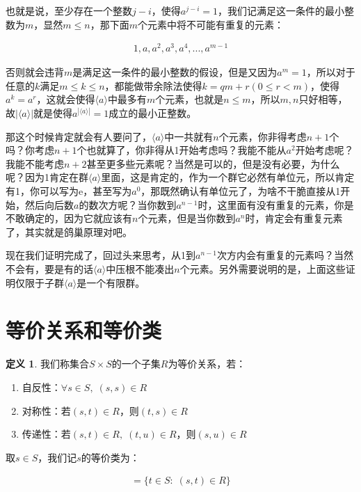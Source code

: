 \documentclass[12pt, a4paper, oneside]{ctexart}
\theoremstyle{definition}
\newtheorem*{definition}{定义}
\begin{document}
也就是说，至少存在一个整数$j-i$，使得$a^{j-i}=1$，我们记满足这一条件的最小整数为$m$，显然$m\leqslant n$，那下面$m$个元素中将不可能有重复的元素：

\begin{align*}
1,a,a^2,a^3,a^4,...,a^{m-1}
\end{align*}

否则就会违背$m$是满足这一条件的最小整数的假设，但是又因为$a^m=1$，所以对于任意的$k$满足$m\leqslant k\leqslant n$，都能做带余除法使得$k=qm+r(0\leqslant r<m)$，使得$a^k=a^r$，这就会使得$\langle a \rangle$中最多有$m$个元素，也就是$n\leqslant m$，所以$m,n$只好相等，故$|\langle a \rangle|$就是使得$a^{|\langle a \rangle|}=1$成立的最小正整数。

那这个时候肯定就会有人要问了，$\langle a \rangle$中一共就有$n$个元素，你非得考虑$n+1$个吗？你考虑$n+1$个也就算了，你非得从1开始考虑吗？我能不能从$a^2$开始考虑呢？我能不能考虑$n+2$甚至更多些元素呢？当然是可以的，但是没有必要，为什么呢？因为1肯定在群$\langle a \rangle$里面，这是肯定的，作为一个群它必然有单位元，所以肯定有1，你可以写为e，甚至写为$a^0$，那既然确认有单位元了，为啥不干脆直接从1开始，然后向后数$a$的数次方呢？当你数到$a^{n-1}$时，这里面有没有重复的元素，你是不敢确定的，因为它就应该有$n$个元素，但是当你数到$a^n$时，肯定会有重复元素了，其实就是鸽巢原理对吧。

现在我们证明完成了，回过头来思考，从1到$a^{n-1}$次方内会有重复的元素吗？当然不会有，要是有的话$\langle a \rangle$中压根不能凑出$n$个元素。另外需要说明的是，上面这些证明仅限于子群$\langle a \rangle$是一个有限群。

\section*{等价关系和等价类}

\begin{definition}
我们称集合$S\times S$的一个子集$R$为等价关系，若：
\begin{enumerate}
\item 自反性：$\forall s\in S,\;(s,s)\in R$
\item 对称性：若$(s,t)\in R$，则$(t,s)\in R$
\item 传递性：若$(s,t)\in R,\;(t,u)\in R$，则$(s,u)\in R$
\end{enumerate}
取$s\in S$，我们记$s$的等价类为：

\begin{align*}
[s]=\{t\in S:\;(s,t)\in R\}
\end{align*}
\end{definition}
\end{document}
